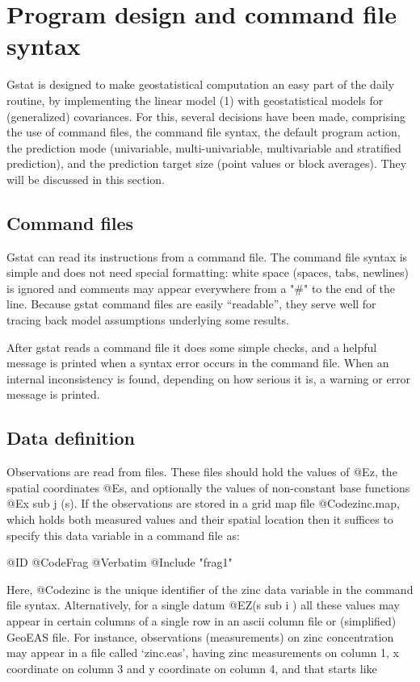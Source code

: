 \documentclass{article}
\begin{document}
\section{ Program design and command file syntax }
\label{design}

Gstat is designed to make geostatistical computation an easy part of the
daily routine, by implementing the linear model (1) with geostatistical
models for (generalized) covariances. For this, several decisions
have been made, comprising the use of command files, the command file
syntax, the default program action, the prediction mode (univariable,
multi-univariable, multivariable and stratified prediction), and the
prediction target size (point values or block averages). They will be
discussed in this section.

\subsection{Command files}
Gstat can read its instructions from a command file. The command file
syntax is simple and does not need special formatting: white space
(spaces, tabs, newlines) is ignored and comments may appear everywhere
from a "#" to the end of the line.  Because gstat command files are
easily ``readable'', they serve well for tracing back model assumptions
underlying some results.

After gstat reads a command file it does some simple checks, and a helpful
message is printed when a syntax error occurs in the command file.
When an internal inconsistency is found, depending on how serious it
is, a warning or error message is printed.

\subsection{Data definition}
Observations are read from files. These files should hold the values of
@E{z}, the spatial coordinates @E{s}, and optionally the values of
non-constant base functions @E{x sub j (s)}. If the observations are
stored in a grid map file @Code{zinc.map}, which holds both measured
values and their spatial location then it suffices to specify this data
variable in a command file as:

@ID @CodeFrag { @Verbatim { @Include { "frag1" }}}

Here, @Code{zinc} is the unique identifier of the zinc data variable in
the command file syntax. Alternatively, for a single datum @E{Z(s sub i
)} all these values may appear in certain columns of a single row in an
ascii column file or (simplified) GeoEAS file. For instance,
observations (measurements) on zinc concentration may appear in a file
called `zinc.eas', having zinc measurements on column 1, x coordinate on
column 3 and y coordinate on column 4, and that starts like
\end{document}
